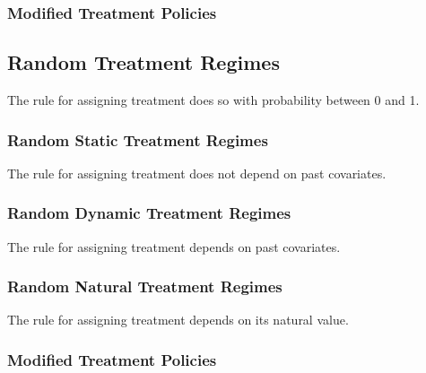 \documentclass[12pt,twoside]{article}
\begin{document}
\subsubsection{Modified Treatment Policies}

\subsection{Random Treatment Regimes}
The rule for assigning treatment does so with probability between 0 and 1.

\subsubsection{Random Static Treatment Regimes}
The rule for assigning treatment does not depend on past covariates.

\subsubsection{Random Dynamic Treatment Regimes}
The rule for assigning treatment depends on past covariates.

\subsubsection{Random Natural Treatment Regimes}
The rule for assigning treatment depends on its natural value.

\subsubsection{Modified Treatment Policies}
\end{document}
